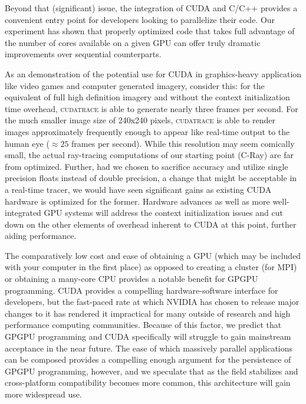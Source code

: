 \documentclass[12pt]{article}
\begin{document}
Beyond that (significant) issue, the integration of CUDA and C/C++ provides a convenient entry point for developers looking to parallelize their code. Our experiment has shown that properly optimized code that takes full advantage of the number of cores available on a given GPU can offer truly dramatic improvements over sequential counterparts.

As an demonstration of the potential use for CUDA in graphics-heavy application like video games and computer generated imagery, consider this: for the equivalent of full high definition imagery and without the context initialization time overhead, \textsc{cudatrace} is able to generate nearly three frames per second. For the much smaller image size of 240x240 pixels, \textsc{cudatrace} is able to render images approximately frequently enough to appear like real-time output to the human eye ($\approx 25$ frames per second). While this resolution may seem comically small, the actual ray-tracing computations of our starting point (C-Ray) are far from optimized. Further, had we chosen to sacrifice accuracy and utilize single precision floats instead of double precision, a change that might be acceptable in a real-time tracer, we would have seen significant gains as existing CUDA hardware is optimized for the former. Hardware advances as well as more well-integrated GPU systems will address the context initialization issues and cut down on the other elements of overhead inherent to CUDA at this point, further aiding performance.

The comparatively low cost and ease of obtaining a GPU (which may be included with your computer in the first place) as opposed to creating a cluster (for MPI) or obtaining a many-core CPU provides a notable benefit for GPGPU programming. CUDA provides a compelling hardware-software interface for developers, but the fast-paced rate at which NVIDIA has chosen to release major changes to it has rendered it impractical for many outside of research and high performance computing communities. Because of this factor, we predict that GPGPU programming and CUDA specifically will struggle to gain mainstream acceptance in the near future. The ease of which massively parallel applications can be composed provides a compelling enough argument for the persistence of GPGPU programming, however, and we speculate that as the field stabilizes and cross-platform compatibility becomes more common, this architecture will gain more widespread use.
\end{document}
